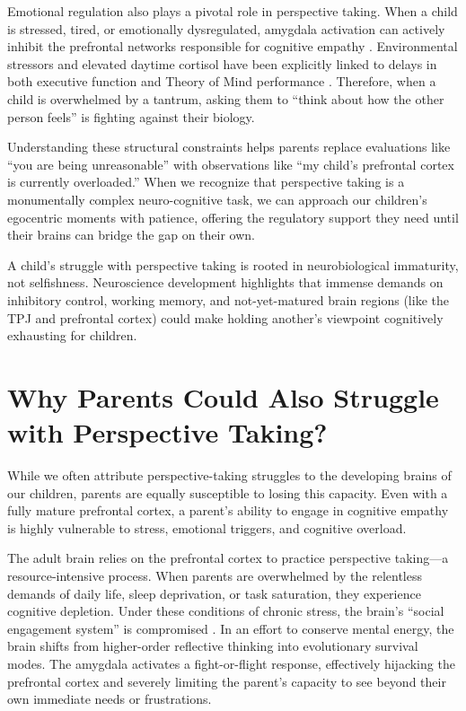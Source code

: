 Emotional regulation also plays a pivotal role in perspective taking. 
When a child is stressed, tired, or emotionally dysregulated, amygdala activation can actively inhibit the prefrontal networks responsible for cognitive empathy \citep{thompson2026b}. 
Environmental stressors and elevated daytime cortisol have been explicitly linked to delays in both executive function and Theory of Mind performance \citep{devine2024}. 
Therefore, when a child is overwhelmed by a tantrum, asking them to ``think about how the other person feels'' is fighting against their biology.

Understanding these structural constraints helps parents replace evaluations like ``you are being unreasonable'' with observations like ``my child's prefrontal cortex is currently overloaded.'' 
When we recognize that perspective taking is a monumentally complex neuro-cognitive task, we can approach our children’s egocentric moments with patience, offering the regulatory support they need until their brains can bridge the gap on their own.

\begin{keyinsight}
A child's struggle with perspective taking is rooted in neurobiological immaturity, not selfishness. 
Neuroscience development highlights that immense demands on inhibitory control, working memory, and not-yet-matured brain regions (like the TPJ and prefrontal cortex) could make holding another's viewpoint cognitively exhausting for children.
\end{keyinsight}

\section{Why Parents Could Also Struggle with Perspective Taking?}

While we often attribute perspective-taking struggles to the developing brains of our children, parents are equally susceptible to losing this capacity. 
Even with a fully mature prefrontal cortex, a parent's ability to engage in cognitive empathy is highly vulnerable to stress, emotional triggers, and cognitive overload.

The adult brain relies on the prefrontal cortex to practice perspective taking---a resource-intensive process. 
When parents are overwhelmed by the relentless demands of daily life, sleep deprivation, or task saturation, they experience cognitive depletion. 
Under these conditions of chronic stress, the brain's ``social engagement system'' is compromised \citep{porges2011}. 
In an effort to conserve mental energy, the brain shifts from higher-order reflective thinking into evolutionary survival modes. 
The amygdala activates a fight-or-flight response, effectively hijacking the prefrontal cortex and severely limiting the parent's capacity to see beyond their own immediate needs or frustrations.

